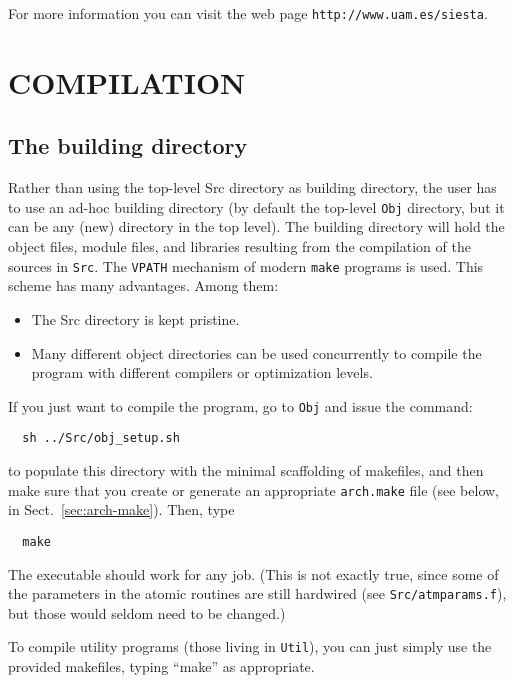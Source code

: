 \documentclass[11pt]{article}
\begin{document}
For more information you can visit the web page
{\tt http://www.uam.es/siesta}.

\section{COMPILATION}

\subsection{The building directory}

Rather than using the top-level Src directory as building directory,
the user has to use an ad-hoc building directory (by default the
top-level {\tt Obj} directory, but it can be any (new) directory in
the top level).  The building directory will hold the object files,
module files, and libraries resulting from the compilation of the
sources in {\tt Src}.  The {\tt VPATH} mechanism of modern {\tt make}
programs is used. This scheme has many advantages. Among them:

\begin{itemize}
\item The Src directory is kept pristine.
\item Many different object directories can be used concurrently to
  compile the program with different compilers or optimization levels.
\end{itemize}

If you just want to compile the program, go to {\tt Obj} and issue the
command:

\begin{verbatim}
  sh ../Src/obj_setup.sh
\end{verbatim}

to populate this directory with the minimal scaffolding of makefiles,
and then make sure that you create or generate an appropriate {\tt arch.make}
file (see below, in Sect.~\ref{sec:arch-make}). Then, type

\begin{verbatim}
  make
\end{verbatim}

The executable should work for any job. (This is not exactly true,
since some of the parameters in the atomic routines are still
hardwired (see {\tt Src/atmparams.f}), but those would seldom need to
be changed.)

To compile utility programs (those living in {\tt Util}), you can just
simply use the provided makefiles, typing ``make'' as appropriate.
\end{document}
